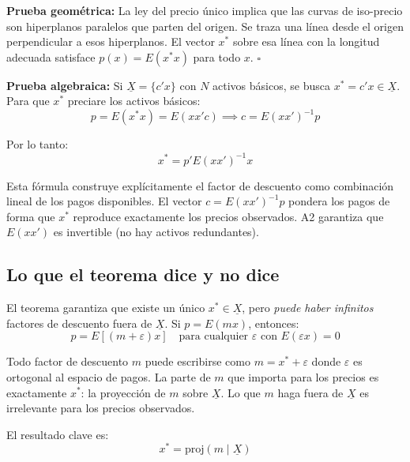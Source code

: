 \documentclass[12pt]{article}
\begin{document}
\textbf{Prueba geom\'etrica:} La ley del precio \'unico implica que las curvas de iso-precio son hiperplanos paralelos que parten del origen. Se traza una l\'inea desde el origen perpendicular a esos hiperplanos. El vector $x^*$ sobre esa l\'inea con la longitud adecuada satisface $p(x) = E(x^*x)$ para todo $x$. $\square$

\textbf{Prueba algebraica:} Si $\underline{X} = \{c'x\}$ con $N$ activos b\'asicos, se busca $x^* = c'x \in \underline{X}$. Para que $x^*$ preciare los activos b\'asicos:
\begin{equation}
    p = E(x^* x) = E(xx'c) \implies c = E(xx')^{-1}p
\end{equation}

Por lo tanto:
\begin{equation}
    x^* = p' E(xx')^{-1} x \label{eq:xstar}
\end{equation}

\begin{intuicionmat}
Esta f\'ormula construye expl\'icitamente el factor de descuento como combinaci\'on lineal de los pagos disponibles. El vector $c = E(xx')^{-1}p$ pondera los pagos de forma que $x^*$ reproduce exactamente los precios observados. A2 garantiza que $E(xx')$ es invertible (no hay activos redundantes).
\end{intuicionmat}

\subsection{Lo que el teorema dice y no dice}

El teorema garantiza que existe un \'unico $x^* \in \underline{X}$, pero \emph{puede haber infinitos} factores de descuento fuera de $\underline{X}$. Si $p = E(mx)$, entonces:
\begin{equation}
    p = E[(m + \varepsilon)x] \quad \text{para cualquier } \varepsilon \text{ con } E(\varepsilon x) = 0
\end{equation}

\begin{intuicionmat}
Todo factor de descuento $m$ puede escribirse como $m = x^* + \varepsilon$ donde $\varepsilon$ es ortogonal al espacio de pagos. La parte de $m$ que importa para los precios es exactamente $x^*$: la proyecci\'on de $m$ sobre $\underline{X}$. Lo que $m$ haga fuera de $\underline{X}$ es irrelevante para los precios observados.
\end{intuicionmat}

El resultado clave es:
\begin{equation}
    x^* = \text{proj}(m \mid \underline{X})
\end{equation}
\end{document}
